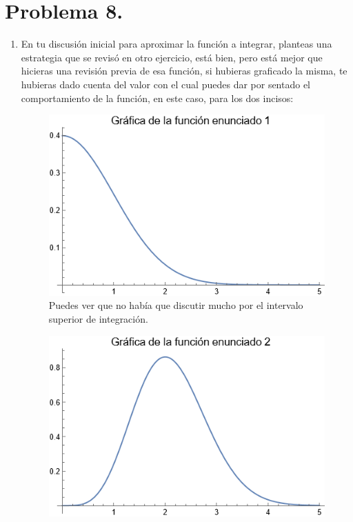 \section{Problema 8.}

\begin{enumerate}
\item En tu discusión inicial para aproximar la función a integrar, planteas una estrategia que se revisó en otro ejercicio, está bien, pero está mejor que hicieras una revisión previa de esa función, si hubieras graficado la misma, te hubieras dado cuenta del valor con el cual puedes dar por sentado el comportamiento de la función, en este caso, para los dos incisos:
\begin{figure}[H]
    \centering
    \includegraphics[scale=0.8]{plot_P1_Inciso_01.png}
    \caption{Puedes ver que no había que discutir mucho por el intervalo superior de integración.}
\end{figure}
\begin{figure}[H]
    \centering
    \includegraphics[scale=0.8]{plot_P1_Inciso_02.png}

\end{figure}
\end{enumerate}
